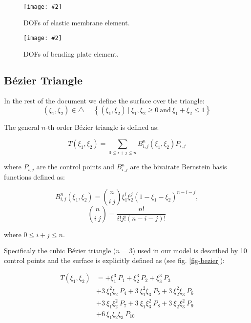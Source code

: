 \documentclass{egpubl}
\newcommand{\Figure}[3]{%
\begin{figure}[htb]
  \centering
  \texttt{[image: \#2]}
  \caption{\label{fig-#2}#3}
\end{figure}}
\begin{document}
\Figure{0.8\linewidth}{membrane}
{DOFs of elastic membrane element.}

\Figure{0.8\linewidth}{plate}
{DOFs of bending plate element.}

\subsection{Bézier Triangle} %

In the rest of the document we define the surface over the triangle:
\begin{equation}
    (\xi_1,\xi_2) \in \bigtriangleup = \left\{ (\xi_1,\xi_2)~|~\xi_1, \xi_2 \ge 0
        \mathrm{~and~} \xi_1+\xi_2 \le 1 \right\}
\end{equation}

The general $n$-th order Bézier triangle is defined as:

\begin{equation}
    T(\xi_1, \xi_2) = \sum_{0 \le i + j \le n} B^n_{i,j}(\xi_1,\xi_2) P_{i,j}
\end{equation}

where $P_{i,j}$ are the control points and $B^n_{i,j}$ are the bivairate
Bernstein basis functions defined as:

\begin{equation}
  B^n_{i,j} (\xi_1,\xi_2) =
    \binom{n}{i~j} \xi_1^i \xi_2^j (1-\xi_1-\xi_2)^{n-i-j},
\end{equation}
\begin{equation}
  \binom{n}{i~j} = \frac{n!}{i!j!(n-i-j)!}
\end{equation}

where $ 0 \le i+j \le n $.

Specificaly the cubic Bézier triangle ($n=3$) used in our model is
described by 10 control points and the surface is explicitly defined as (see
fig. \ref{fig-bezier}):

\begin{equation}\label{eq-cubicbez}
  \begin{split}
  T(\xi_1,\xi_2) & =
           + \xi_1^3\ P_1
           + \xi_2^3\ P_2
           + \xi_3^3\ P_3 \\
         & + 3\ \xi_1^2 \xi_2\ P_4
           + 3\ \xi_1^2 \xi_3\ P_5
           + 3\ \xi_2^2 \xi_3\ P_6 \\
         & + 3\ \xi_1 \xi_2^2\ P_7
           + 3\ \xi_1 \xi_3^2\ P_8
           + 3\ \xi_2 \xi_3^2\ P_9 \\
         & + 6\ \xi_1 \xi_2 \xi_3\ P_{10} \\
  \end{split}
\end{equation}
\end{document}
